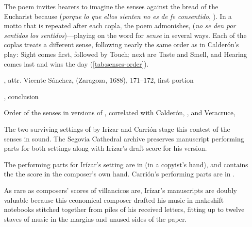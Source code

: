 The poem invites hearers to imagine the senses 
against the bread of the Eucharist because  (\emph{porque lo que ellos sienten no es de fe consentido},
).%
    \Autocite[171--172]{Sanchez:LiraPoetica}
In a motto that is repeated after each copla, the poem admonishes,  (\emph{no se den por sentidos los sentidos})---playing
on the word for \emph{sense} in several ways.  
Each of the coplas treats a different sense, following nearly the same order as
in Calderón's play: Sight comes first, followed by Touch; next are Taste and
Smell, and Hearing comes last and wins the day (\cref{tab:senses-order}).

\begin{poemexample}
    \caption{, attr. Vicente
    Sánchez,  (Zaragoza, 1688), 171--172, first portion}
    
    \label{poem:Si_los_sentidos-Sanchez-1}
\end{poemexample}

\begin{poemexample}
    \caption{, conclusion}

    \label{poem:Si_los_sentidos-Sanchez-2}
\end{poemexample}


\begin{table}
    \caption{Order of the senses in versions of ,
    correlated with Calderón, , and
    Veracruce, } 
    
    \label{tab:senses-order}
\end{table}

The two surviving settings of  by Irízar and Carrión
stage this contest of the senses in sound.
The Segovia Cathedral archive preserves manuscript performing parts for both
settings along with Irízar's draft score for his version.%
\begin{Footnote}
    The performing parts for Irízar's setting are in  (in a
    copyist's hand), and  contains the the score in the
    composer's own hand.
    Carrión's performing parts are in .
\end{Footnote}
As rare as composers' scores of villancicos are, Irízar's manuscripts are doubly
valuable because this economical composer drafted his music in makeshift
notebooks stitched together from piles of his received letters, fitting up to
twelve staves of music in the margins and unused sides of the paper.

